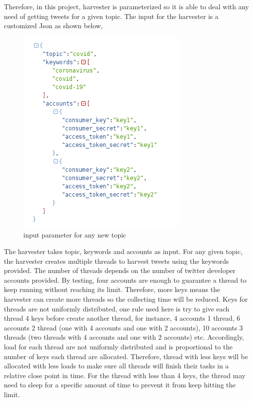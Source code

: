 Therefore, in this project, harvester is parameterized so it is able to deal with any need of getting tweets for a given topic. The input for the harvester is a customized Json as shown below,

\begin{figure}[H]
\centering
\includegraphics[scale=0.8]{city_analytics/report/images/harvester_input.png}
\caption{input parameter for any new topic}
\label{fig:input parameter for any new topic}
\end{figure}


The harvester takes topic, keywords and accounts as input. For any given topic, the harvester creates multiple threads to harvest tweets using the keywords provided. The number of threads depends on the number of twitter developer accounts provided. By testing, four accounts are enough to guarantee a thread to keep running without reaching its limit. Therefore, more keys means the harvester can create more threads so the collecting time will be reduced. Keys for threads are not uniformly distributed, one rule used here is try to give each thread 4 keys before create another thread, for instance, 4 accounts 1 thread, 6 accounts 2 thread (one with 4 accounts and one with 2 accounts), 10 accounts 3 threads (two threads with 4 accounts and one with 2 accounts) etc. Accordingly, load for each thread are not uniformly distributed and is proportional to the number of keys each thread are allocated. Therefore, thread with less keys will be allocated with less loads to make sure all threads will finish their tasks in a relative close point in time. For the thread with less than 4 keys, the thread may need to sleep for a specific amount of time to prevent it from keep hitting the limit.


